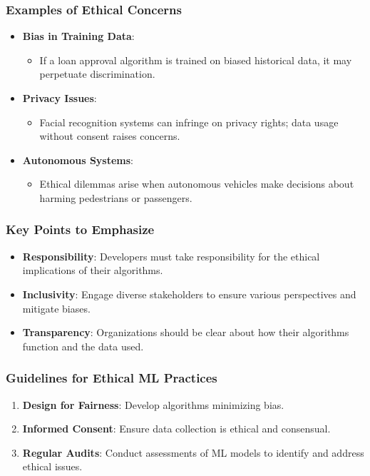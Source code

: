 \documentclass[aspectratio=169]{beamer}
\begin{document}
\begin{frame}[fragile]
    \frametitle{Examples of Ethical Concerns}
    \begin{itemize}
        \item \textbf{Bias in Training Data}:
        \begin{itemize}
            \item If a loan approval algorithm is trained on biased historical data, it may perpetuate discrimination.
        \end{itemize}
        
        \item \textbf{Privacy Issues}:
        \begin{itemize}
            \item Facial recognition systems can infringe on privacy rights; data usage without consent raises concerns.
        \end{itemize}
        
        \item \textbf{Autonomous Systems}:
        \begin{itemize}
            \item Ethical dilemmas arise when autonomous vehicles make decisions about harming pedestrians or passengers.
        \end{itemize}
    \end{itemize}
\end{frame}

\begin{frame}[fragile]
    \frametitle{Key Points to Emphasize}
    \begin{itemize}
        \item \textbf{Responsibility}: Developers must take responsibility for the ethical implications of their algorithms.
        \item \textbf{Inclusivity}: Engage diverse stakeholders to ensure various perspectives and mitigate biases.
        \item \textbf{Transparency}: Organizations should be clear about how their algorithms function and the data used.
    \end{itemize}
\end{frame}

\begin{frame}[fragile]
    \frametitle{Guidelines for Ethical ML Practices}
    \begin{enumerate}
        \item \textbf{Design for Fairness}: Develop algorithms minimizing bias.
        \item \textbf{Informed Consent}: Ensure data collection is ethical and consensual.
        \item \textbf{Regular Audits}: Conduct assessments of ML models to identify and address ethical issues.
    \end{enumerate}
\end{frame}
\end{document}
